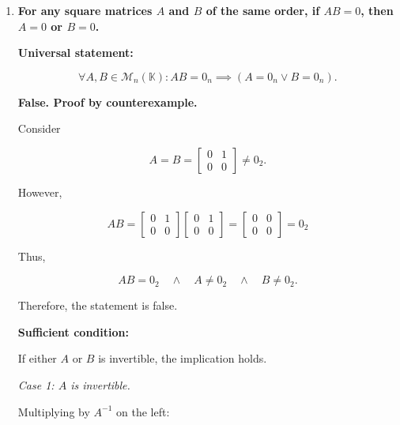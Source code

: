 \begin{enumerate}[label=\alph*)]
\begin{answer}
    Hence, all corresponding entries
    are equal, so

    $$
    \boxed{AB=BA}.
    $$

    \textbf{Extra: }
    $Other options are: A = 0, A = I_n, A = B, B = A^n$
\end{answer}


\item {\bfseries\boldmath
    For any square matrices $A$ and $B$
    of the same order, if $AB=0$,
    then $A=0$ or $B=0$.
}

\begin{answer}
    \textbf{Universal statement:}

    $$
    \forall A,B\in\mathcal{M}_n(\mathbb{K}):
    AB=0_n\implies
    (A=0_n\lor B=0_n).
    $$

    \textbf{False. Proof by counterexample.}

    Consider

    $$
    A=B=\begin{bmatrix}
        0 & 1 \\
        0 & 0
    \end{bmatrix}
    \neq0_2.
    $$

    However,

    $$
    AB=\begin{bmatrix}
        0 & 1 \\
        0 & 0
    \end{bmatrix}
    \begin{bmatrix}
        0 & 1 \\
        0 & 0
    \end{bmatrix} =\begin{bmatrix}
        0 & 0 \\
        0 & 0
    \end{bmatrix}=0_2
    $$

    Thus,

    $$
    AB=0_2
    \quad\land\quad
    A\neq0_2
    \quad\land\quad
    B\neq0_2.
    $$

    Therefore, the statement is false.

    \par\bigskip
    \noindent\textbf{Sufficient condition:}

    If either $A$ or $B$ is invertible,
    the implication holds.

    \par\smallskip
    \noindent\textit{Case 1: $A$ is invertible.}

    Multiplying by $A^{-1}$ on the left:


\end{answer}
\end{enumerate}
